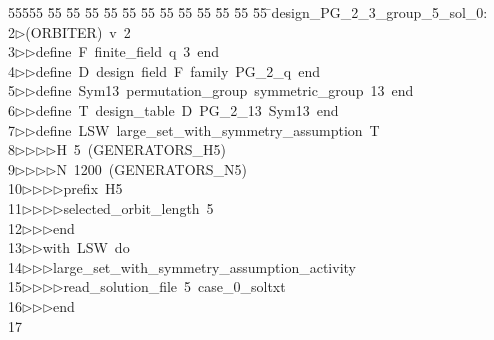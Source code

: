 %
%
\begin{tabbing}
55555 \= 55 \= 55 \= 55 \= 55 \= 55 \= 55 \= 55 \= 55 \= 55 \= 55 \= 55 \= 55 \= \>design\_PG\_2\_3\_group\_5\_sol\_0:\\[0pt]
2\>$\triangleright$\>(ORBITER)\ v\ 2\ \\[0pt]
3\>$\triangleright$\>$\triangleright$\>define\ F\ finite\_field\ q\ 3\ end\ \\[0pt]
4\>$\triangleright$\>$\triangleright$\>define\ D\ design\ field\ F\ family\ PG\_2\_q\ end\ \\[0pt]
5\>$\triangleright$\>$\triangleright$\>define\ Sym13\ permutation\_group\ symmetric\_group\ 13\ end\ \\[0pt]
6\>$\triangleright$\>$\triangleright$\>define\ T\ design\_table\ D\ PG\_2\_13\ Sym13\ end\ \\[0pt]
7\>$\triangleright$\>$\triangleright$\>define\ LSW\ large\_set\_with\_symmetry\_assumption\ T\ \\[0pt]
8\>$\triangleright$\>$\triangleright$\>$\triangleright$\>$\triangleright$\>H\ 5\ (GENERATORS\_H5)\ \\[0pt]
9\>$\triangleright$\>$\triangleright$\>$\triangleright$\>$\triangleright$\>N\ 1200\ (GENERATORS\_N5)\ \\[0pt]
10\>$\triangleright$\>$\triangleright$\>$\triangleright$\>$\triangleright$\>prefix\ H5\ \\[0pt]
11\>$\triangleright$\>$\triangleright$\>$\triangleright$\>$\triangleright$\>selected\_orbit\_length\ 5\ \\[0pt]
12\>$\triangleright$\>$\triangleright$\>$\triangleright$\>end\ \\[0pt]
13\>$\triangleright$\>$\triangleright$\>with\ LSW\ do\ \\[0pt]
14\>$\triangleright$\>$\triangleright$\>$\triangleright$\>large\_set\_with\_symmetry\_assumption\_activity\ \\[0pt]
15\>$\triangleright$\>$\triangleright$\>$\triangleright$\>$\triangleright$\>read\_solution\_file\ 5\ case\_0\_soltxt\ \\[0pt]
16\>$\triangleright$\>$\triangleright$\>$\triangleright$\>end\\[0pt]
17\>\end{tabbing}
